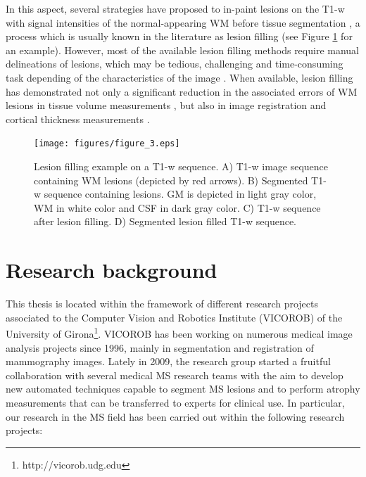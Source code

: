 In this aspect, several strategies have proposed to in-paint lesions on the T1-w with signal intensities of the normal-appearing WM before tissue segmentation \cite{Battaglini2012, Chard2010, Magon2014, Sdika2009}, a process which is usually known in the literature as lesion filling (see Figure \ref{lesion_filling} for an example). However, most of the available lesion filling methods require manual delineations of lesions, which may be tedious, challenging and time-consuming task depending of the characteristics of the image \cite{Llado2012}. When available, lesion filling has demonstrated not only a significant reduction in the associated errors of WM lesions in tissue volume measurements \cite{Popescu2014}, but also in image registration \cite{Ceccarelli2012,  Diez2014, Sdika2009} and cortical thickness measurements \cite{Magon2014}. 

\begin{figure}[top]
  \begin{center}
    \texttt{[image: figures/figure\_3.eps]}
  \end{center}
    \caption[Lesion filling example on a T1-w sequence]{Lesion filling example on a T1-w sequence. A) T1-w image sequence containing WM lesions (depicted by red arrows). B) Segmented T1-w sequence containing lesions. GM is depicted in light gray color, WM in white color and CSF in dark gray color.  C) T1-w sequence after lesion filling. D) Segmented lesion filled T1-w sequence.}
    \label{lesion_filling}
\end{figure}

\section{Research background}
\label{sec:research_background}

This thesis is located within the framework of different research projects associated to the Computer Vision and Robotics Institute (VICOROB) of the University of Girona\footnote{http://vicorob.udg.edu}. VICOROB has been working on numerous medical image analysis projects since 1996, mainly in segmentation and registration of mammography images. Lately in 2009, the research group started a fruitful collaboration with several medical MS research teams with the aim to develop new automated techniques capable to segment MS lesions and to perform atrophy measurements that can be transferred to experts for clinical use. In particular, our research in the MS field has been carried out within the following research projects:

